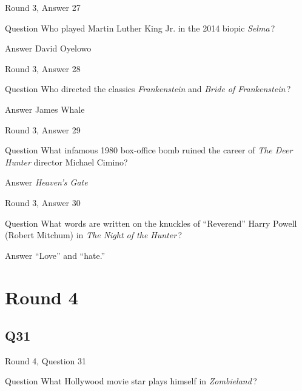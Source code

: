 \documentclass[11pt]{beamer}
\begin{document}
\begin{frame}[t]{Round 3, Answer 27}
\vspace{2em}
\begin{block}{Question}
Who played Martin Luther King Jr. in the 2014 biopic \emph{Selma}\,?
\end{block}
\pause{}
\begin{block}{Answer}
David Oyelowo
\end{block}
\end{frame}
    

\begin{frame}[t]{Round 3, Answer 28}
\vspace{2em}
\begin{block}{Question}
Who directed the classics \emph{Frankenstein} and \emph{Bride of Frankenstein}\,?
\end{block}
\pause{}
\begin{block}{Answer}
James Whale
\end{block}
\end{frame}
    

\begin{frame}[t]{Round 3, Answer 29}
\vspace{2em}
\begin{block}{Question}
What infamous 1980 box-office bomb ruined the career of \emph{The Deer Hunter} director Michael Cimino?
\end{block}
\pause{}
\begin{block}{Answer}
\emph{Heaven's Gate}
\end{block}
\end{frame}
    

\begin{frame}[t]{Round 3, Answer 30}
\vspace{2em}
\begin{block}{Question}
What words are written on the knuckles of ``Reverend'' Harry Powell (Robert Mitchum) in \emph{The Night of the Hunter}\,?
\end{block}
\pause{}
\begin{block}{Answer}
``Love'' and ``hate.''
\end{block}
\end{frame}
    

\section{Round 4}
    

\subsection*{Q31}
\begin{frame}[t]{Round 4, Question 31}
\vspace{2em}
\begin{block}{Question}
What Hollywood movie star plays himself in \emph{Zombieland}\,?
\end{block}
\end{frame}
    
\end{document}
